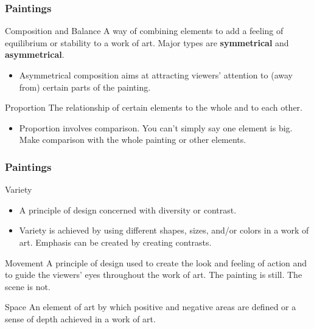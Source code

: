 \documentclass{beamer}
\begin{document}
\begin{frame}
\frametitle{Paintings}
\begin{block}{Composition and Balance}
A way of combining elements to add a feeling of equilibrium or stability to a work of art. Major types are \textbf{symmetrical} and \textbf{asymmetrical}.
\begin{itemize}
\item Asymmetrical composition aims at attracting viewers' attention to (away from) certain parts of the painting.
\end{itemize}
\end{block}

\begin{block}{Proportion}
The relationship of certain elements to the whole and to each other.
\begin{itemize}
\item Proportion involves comparison. You can't simply say one element is big. Make comparison with the whole painting or other elements.
\end{itemize}
\end{block}
\end{frame}
\begin{frame}
\frametitle{Paintings}
\begin{block}{Variety}
\begin{itemize}
\item A principle of design concerned with diversity or contrast. 
\item Variety is achieved by using different shapes, sizes, and/or colors in a work of art. Emphasis can be created by creating contrasts.
\end{itemize}
\end{block}

\begin{block}{Movement}
A principle of design used to create the look and feeling of action and to guide the viewers' eyes throughout the work of art. The painting is still. The scene is not.
\end{block}

\begin{block}{Space}
An element of art by which positive and negative areas are defined or a sense of depth achieved in a work of art.
\end{block}
\end{frame}
\end{document}
